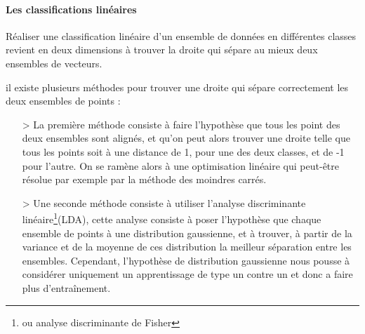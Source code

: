 \documentclass[a4paper,twoside]{report}
\begin{document}
\paragraph{Les classifications linéaires\\}
Réaliser une classification linéaire d'un ensemble de données en différentes classes revient en deux dimensions à trouver la droite qui sépare au mieux deux ensembles de vecteurs.\newline
\begin{center}
\end{center}
il existe plusieurs méthodes pour trouver une droite qui sépare correctement les deux ensembles de points :
\begin{itemize}
  \item[>] La première méthode consiste à faire l'hypothèse que tous les point des deux ensembles sont alignés, et qu'on peut alors trouver une droite telle que tous les points soit à une distance de 1, pour une des deux classes, et de -1 pour l'autre. On se ramène alors à une optimisation linéaire qui peut-être résolue par exemple par la méthode des moindres carrés.
  \item[>] Une seconde méthode consiste à utiliser l'analyse discriminante linéaire\footnote{ou analyse discriminante de Fisher}(LDA), cette analyse consiste à poser l'hypothèse que chaque ensemble de points à une distribution gaussienne, et à trouver, à partir de la variance et de la moyenne de ces distribution la meilleur séparation entre les ensembles. Cependant, l'hypothèse de distribution gaussienne nous pousse à considérer uniquement un apprentissage de type un contre un et donc a faire plus d'entraînement.
\end{itemize}
\end{document}
